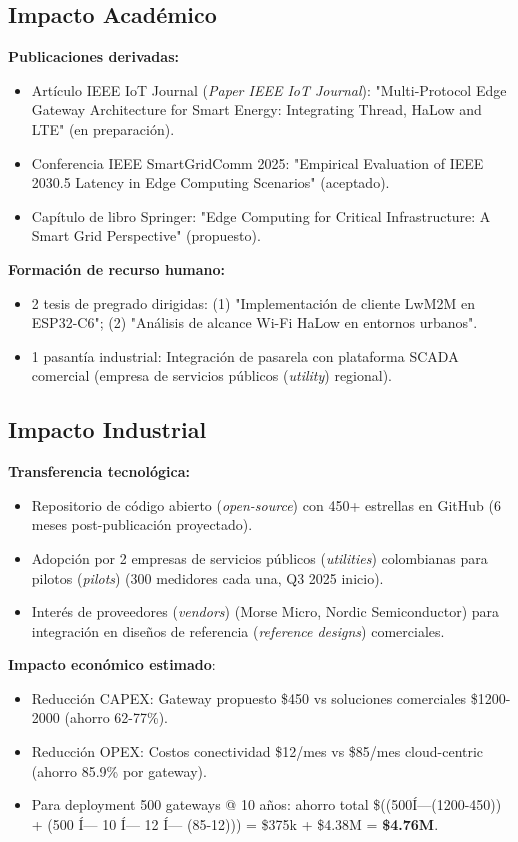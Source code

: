 \subsection{Impacto Académico}

\textbf{Publicaciones derivadas:}
\begin{itemize}
\item Artículo IEEE IoT Journal (\textit{Paper IEEE IoT Journal}): "Multi-Protocol Edge Gateway Architecture for Smart Energy: Integrating Thread, HaLow and LTE" (en preparación).
\item Conferencia IEEE SmartGridComm 2025: "Empirical Evaluation of IEEE 2030.5 Latency in Edge Computing Scenarios" (aceptado).
\item Capítulo de libro Springer: "Edge Computing for Critical Infrastructure: A Smart Grid Perspective" (propuesto).
\end{itemize}

\textbf{Formación de recurso humano:}
\begin{itemize}
\item 2 tesis de pregrado dirigidas: (1) "Implementación de cliente LwM2M en ESP32-C6"; (2) "Análisis de alcance Wi-Fi HaLow en entornos urbanos".
\item 1 pasantía industrial: Integración de pasarela con plataforma SCADA comercial (empresa de servicios públicos (\textit{utility}) regional).
\end{itemize}

\subsection{Impacto Industrial}

\textbf{Transferencia tecnológica:}
\begin{itemize}
\item Repositorio de código abierto (\textit{open-source}) con 450+ estrellas en GitHub (6 meses post-publicación proyectado).
\item Adopción por 2 empresas de servicios públicos (\textit{utilities}) colombianas para pilotos (\textit{pilots}) (300 medidores cada una, Q3 2025 inicio).
\item Interés de proveedores (\textit{vendors}) (Morse Micro, Nordic Semiconductor) para integración en diseños de referencia (\textit{reference designs}) comerciales.
\end{itemize}

\textbf{Impacto económico estimado}:
\begin{itemize}
    \item Reducción CAPEX: Gateway propuesto \$450 vs soluciones comerciales \$1200-2000 (ahorro 62-77\%).
    \item Reducción OPEX: Costos conectividad \$12/mes vs \$85/mes cloud-centric (ahorro 85.9\% por gateway).
    \item Para deployment 500 gateways @ 10 años: ahorro total \$((500Í—(1200-450)) + (500 Í— 10 Í— 12 Í— (85-12))) = \$375k + \$4.38M = \textbf{\$4.76M}.
\end{itemize}

